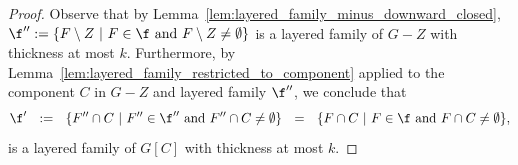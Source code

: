 \begin{proof}
    Observe that by Lemma~\ref{lem:layered_family_minus_downward_closed}, $ \f'' := \{F\setminus Z\ |\ F\in\f \text{ and } F\setminus Z\neq\emptyset\}$ is a layered family of $G-Z$ with thickness at most $k$. Furthermore, by Lemma~\ref{lem:layered_family_restricted_to_component} applied to the component $C$ in $G-Z$ and layered family $\f''$, we conclude that 
    $$\f'\ \ :=\ \ \{F'' \cap C\ |\ F''\in\f'' \text{ and } F''\cap C\neq\emptyset\}\ \ =\ \ \{F\cap C\ |\ F\in\f \text{ and } F\cap C\neq\emptyset\},$$ 
    is a layered family of $G[C]$ with thickness at most $k$.

\end{proof}
